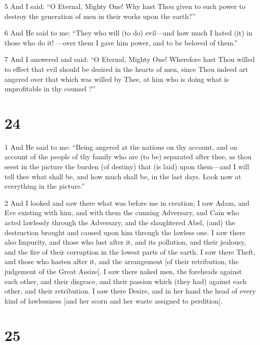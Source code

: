 \par 5 And I said: “O Eternal, Mighty One! Why hast Thou given to such power to destroy the generation of men in their works upon the earth?”

\par 6 And He said to me: “They who will (to do) evil—and how much I hated (it) in those who do it! —over them I gave him power, and to be beloved of them.”

\par 7 And I answered and said: “O Eternal, Mighty One! Wherefore hast Thou willed to effect that evil should be desired in the hearts of men, since Thou indeed art angered over that which was willed by Thee, at him who is doing what is unprofitable in thy counsel ?”

\chapter{24}

\par 1 And He said to me: “Being angered at the nations on thy account, and on account of the people of thy family who are (to be) separated after thee, as thou seest in the picture the burden (of destiny) that (is laid) upon them—and I will tell thee what shall be, and how much shall be, in the last days. Look now at everything in the picture.”

\par 2 And I looked and saw there what was before me in creation; I saw Adam, and Eve existing with him, and with them the cunning Adversary, and Cain who acted lawlessly through the Adversary, and the slaughtered Abel, (and) the destruction brought and caused upon him through the lawless one. I saw there also Impurity, and those who lust after it, and its pollution, and their jealousy, and the fire of their corruption in the lowest parts of the earth. I saw there Theft, and those who hasten after it, and the arrangement [of their retribution, the judgement of the Great Assize]. I saw there naked men, the foreheads against each other, and their disgrace, and their passion which (they had) against each other, and their retribution. I saw there Desire, and in her hand the head of every kind of lawlessness [and her scorn and her waste assigned to perdition]. 

\chapter{25}

